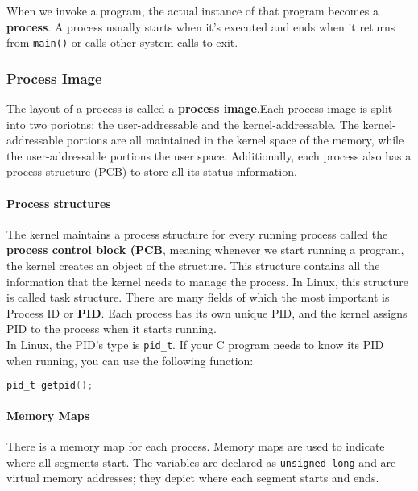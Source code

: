 \documentclass{article}
\newcommand{\bold}[1]{\textbf{#1}}
\newcommand{\code}[1]{\texttt{#1}}
\begin{document}
When we invoke a program, the actual instance of that program becomes a \bold{process}. A process usually starts when it's executed and ends when it returns from \code{main()} or calls other system calls to exit.

\subsubsection{Process Image}

The layout of a process is called a \bold{process image}.Each process image is split into two poriotns; the user-addressable and the kernel-addressable. The kernel-addressable portions are all maintained in the kernel space of the memory, while the user-addressable portions the user space. Additionally, each process also has a process structure (PCB) to store all its status information. 

\paragraph{Process structures}

The kernel maintains a process structure for every running process called the \bold{process control block (PCB}, meaning whenever we start running a program, the kernel creates an object of the structure. This structure contains all the information that the kernel needs to manage the process. In Linux, this structure is called task structure. There are many fields of which the most important is Process ID or \bold{PID}. Each process has its own unique PID, and the kernel assigns PID to the process when it starts running. \\

\noindent In Linux, the PID's type is \code{pid\_t}. If your C program needs to know its PID when running, you can use the following function: 

\begin{lstlisting}[language=C]
pid_t getpid();
\end{lstlisting}

\paragraph{Memory Maps}

There is a memory map for each process. Memory maps are used to indicate where all segments start. The variables are declared as \code{unsigned long} and are virtual memory addresses; they depict where each segment starts and ends. 
\end{document}
